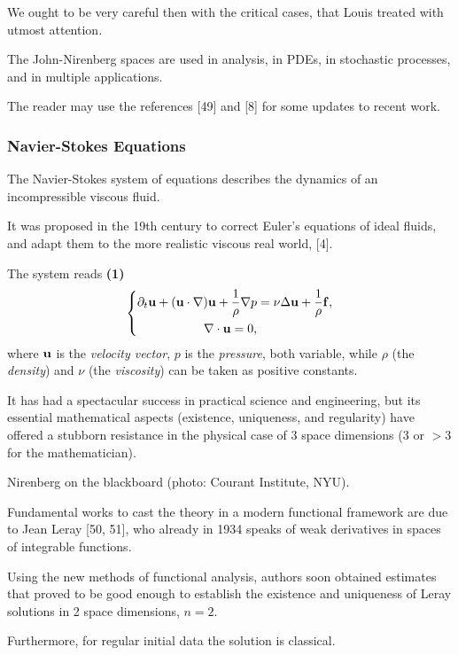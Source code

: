 \documentclass{article}
\begin{document}
We ought to be very careful then with the critical cases, that Louis treated with utmost attention.

The John-Nirenberg spaces are used in analysis, in PDEs, in stochastic processes, and in multiple applications.

The reader may use the references [49] and [8] for some updates to recent work.

\subsubsection{Navier-Stokes Equations}
The Navier-Stokes system of equations describes the dynamics of an incompressible viscous fluid.

It was proposed in the 19th century to correct Euler's equations of ideal fluids, and adapt them to the more realistic viscous real world, [4].

The system reads \textbf{(1)}
\begin{equation*}
	\left\{\begin{split}
		\partial_t{\bf u} + ({\bf u}\cdot\nabla){\bf u} + \frac{1}{\rho}\nabla p &= \nu\Delta{\bf u} + \frac{1}{\rho}{\bf f},\\
		\nabla\cdot{\bf u} = 0,
	\end{split}\right.
\end{equation*}
where ${\bf u}$ is the \textit{velocity vector}, $p$ is the \textit{pressure}, both variable, while $\rho$ (the \textit{density}) and $\nu$ (the \textit{viscosity}) can be taken as positive constants.

It has had a spectacular success in practical science and engineering, but its essential mathematical aspects (existence, uniqueness, and regularity) have offered a stubborn resistance in the physical case of 3 space dimensions (3 or $> 3$ for the mathematician).

\textsf{Nirenberg on the blackboard (photo: Courant Institute, NYU).}

%
Fundamental works to cast the theory in a modern functional framework are due to Jean Leray [50, 51], who already in 1934 speaks of weak derivatives in spaces of integrable functions.

Using the new methods of functional analysis, authors soon obtained estimates that proved to be good enough to establish the existence and uniqueness of Leray solutions in 2 space dimensions, $n = 2$.

Furthermore, for regular initial data the solution is classical.
\end{document}
